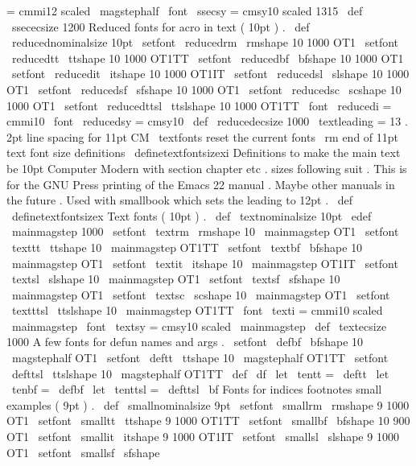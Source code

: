{{{=
cmmi12
scaled
\
magstephalf
\
font
\
ssecsy
=
cmsy10
scaled
1315
\
def
\
ssececsize
{
1200
}
%
Reduced
fonts
for
acro
in
text
(
10pt
)
.
\
def
\
reducednominalsize
{
10pt
}
\
setfont
\
reducedrm
\
rmshape
{
10
}
{
1000
}
{
OT1
}
\
setfont
\
reducedtt
\
ttshape
{
10
}
{
1000
}
{
OT1TT
}
\
setfont
\
reducedbf
\
bfshape
{
10
}
{
1000
}
{
OT1
}
\
setfont
\
reducedit
\
itshape
{
10
}
{
1000
}
{
OT1IT
}
\
setfont
\
reducedsl
\
slshape
{
10
}
{
1000
}
{
OT1
}
\
setfont
\
reducedsf
\
sfshape
{
10
}
{
1000
}
{
OT1
}
\
setfont
\
reducedsc
\
scshape
{
10
}
{
1000
}
{
OT1
}
\
setfont
\
reducedttsl
\
ttslshape
{
10
}
{
1000
}
{
OT1TT
}
\
font
\
reducedi
=
cmmi10
\
font
\
reducedsy
=
cmsy10
\
def
\
reducedecsize
{
1000
}
\
textleading
=
13
.
2pt
%
line
spacing
for
11pt
CM
\
textfonts
%
reset
the
current
fonts
\
rm
}
%
end
of
11pt
text
font
size
definitions
\
definetextfontsizexi
%
Definitions
to
make
the
main
text
be
10pt
Computer
Modern
with
%
section
chapter
etc
.
sizes
following
suit
.
This
is
for
the
GNU
%
Press
printing
of
the
Emacs
22
manual
.
Maybe
other
manuals
in
the
%
future
.
Used
with
smallbook
which
sets
the
leading
to
12pt
.
%
\
def
\
definetextfontsizex
{
%
%
Text
fonts
(
10pt
)
.
\
def
\
textnominalsize
{
10pt
}
\
edef
\
mainmagstep
{
1000
}
\
setfont
\
textrm
\
rmshape
{
10
}
{
\
mainmagstep
}
{
OT1
}
\
setfont
\
texttt
\
ttshape
{
10
}
{
\
mainmagstep
}
{
OT1TT
}
\
setfont
\
textbf
\
bfshape
{
10
}
{
\
mainmagstep
}
{
OT1
}
\
setfont
\
textit
\
itshape
{
10
}
{
\
mainmagstep
}
{
OT1IT
}
\
setfont
\
textsl
\
slshape
{
10
}
{
\
mainmagstep
}
{
OT1
}
\
setfont
\
textsf
\
sfshape
{
10
}
{
\
mainmagstep
}
{
OT1
}
\
setfont
\
textsc
\
scshape
{
10
}
{
\
mainmagstep
}
{
OT1
}
\
setfont
\
textttsl
\
ttslshape
{
10
}
{
\
mainmagstep
}
{
OT1TT
}
\
font
\
texti
=
cmmi10
scaled
\
mainmagstep
\
font
\
textsy
=
cmsy10
scaled
\
mainmagstep
\
def
\
textecsize
{
1000
}
%
A
few
fonts
for
defun
names
and
args
.
\
setfont
\
defbf
\
bfshape
{
10
}
{
\
magstephalf
}
{
OT1
}
\
setfont
\
deftt
\
ttshape
{
10
}
{
\
magstephalf
}
{
OT1TT
}
\
setfont
\
defttsl
\
ttslshape
{
10
}
{
\
magstephalf
}
{
OT1TT
}
\
def
\
df
{
\
let
\
tentt
=
\
deftt
\
let
\
tenbf
=
\
defbf
\
let
\
tenttsl
=
\
defttsl
\
bf
}
%
Fonts
for
indices
footnotes
small
examples
(
9pt
)
.
\
def
\
smallnominalsize
{
9pt
}
\
setfont
\
smallrm
\
rmshape
{
9
}
{
1000
}
{
OT1
}
\
setfont
\
smalltt
\
ttshape
{
9
}
{
1000
}
{
OT1TT
}
\
setfont
\
smallbf
\
bfshape
{
10
}
{
900
}
{
OT1
}
\
setfont
\
smallit
\
itshape
{
9
}
{
1000
}
{
OT1IT
}
\
setfont
\
smallsl
\
slshape
{
9
}
{
1000
}
{
OT1
}
\
setfont
\
smallsf
\
sfshape
}}}
